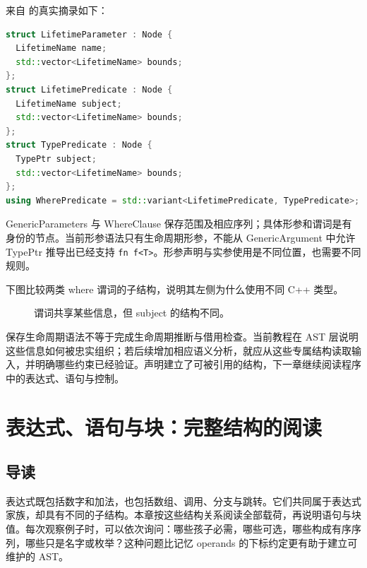 来自  的真实摘录如下：
\begin{lstlisting}[language=C++]
struct LifetimeParameter : Node {
  LifetimeName name;
  std::vector<LifetimeName> bounds;
};
struct LifetimePredicate : Node {
  LifetimeName subject;
  std::vector<LifetimeName> bounds;
};
struct TypePredicate : Node {
  TypePtr subject;
  std::vector<LifetimeName> bounds;
};
using WherePredicate = std::variant<LifetimePredicate, TypePredicate>;
\end{lstlisting}
GenericParameters 与 WhereClause 保存范围及相应序列；具体形参和谓词是有身份的节点。当前形参语法只有生命周期形参，不能从 GenericArgument 中允许 TypePtr 推导出已经支持 \texttt{fn f<T>}。形参声明与实参使用是不同位置，也需要不同规则。

下图比较两类 where 谓词的子结构，说明其左侧为什么使用不同 C++ 类型。
\begin{figure}[htbp]
\centering
{}
\caption{谓词共享某些信息，但 subject 的结构不同。}
\end{figure}
保存生命周期语法不等于完成生命周期推断与借用检查。当前教程在 AST 层说明这些信息如何被忠实组织；若后续增加相应语义分析，就应从这些专属结构读取输入，并明确哪些约束已经验证。声明建立了可被引用的结构，下一章继续阅读程序中的表达式、语句与控制。

\chapter{表达式、语句与块：完整结构的阅读}
\label{chap:front-expressions}

\section*{导读}
表达式既包括数字和加法，也包括数组、调用、分支与跳转。它们共同属于表达式家族，却具有不同的子结构。本章按这些结构关系阅读全部载荷，再说明语句与块值。每次观察例子时，可以依次询问：哪些孩子必需，哪些可选，哪些构成有序序列，哪些只是名字或枚举？这种问题比记忆 operands 的下标约定更有助于建立可维护的 AST。

